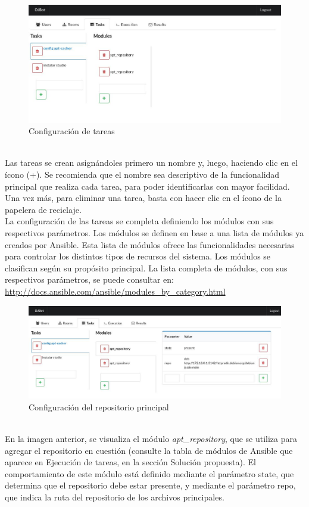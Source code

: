 \documentclass[a4paper,12pt]{article}
\begin{document}
\begin{figure}[htb]
\centering
\includegraphics[width=.9\linewidth]{./img/tasks.photo.jpg}
\caption{Configuración de tareas}
\end{figure} \\

\newpage
Las tareas se crean asignándoles primero un nombre y, luego, haciendo clic en el ícono (+). Se recomienda que el nombre sea descriptivo de la funcionalidad principal que realiza cada tarea, para poder identificarlas con mayor facilidad. Una vez más, para eliminar una tarea, basta con hacer clic en el ícono de la papelera de reciclaje.\\

La configuración de las tareas se completa definiendo los módulos con sus respectivos parámetros. Los módulos se definen en base a una lista de módulos ya creados por Ansible. Esta lista de módulos ofrece las funcionalidades necesarias para controlar los distintos tipos de recursos del sistema. Los módulos se clasifican según su propósito principal. La lista completa de módulos, con sus respectivos parámetros, se puede consultar en:\\

\url{http://docs.ansible.com/ansible/modules_by_category.html}\\

\begin{figure}[htb]
\centering
\includegraphics[width=.9\linewidth]{./img/module.photo.jpg}
\caption{Configuración del repositorio principal}
\end{figure} \\
\newpage
En la imagen anterior, se visualiza el módulo \textit{apt\_repository}, que se utiliza para agregar el repositorio en cuestión (consulte la tabla de módulos de Ansible que aparece en Ejecución de tareas, en la sección Solución propuesta). El comportamiento de este módulo está definido mediante el parámetro state, que determina que el repositorio debe estar presente, y mediante el parámetro repo, que indica la ruta del repositorio de los archivos principales.\\
\end{document}
